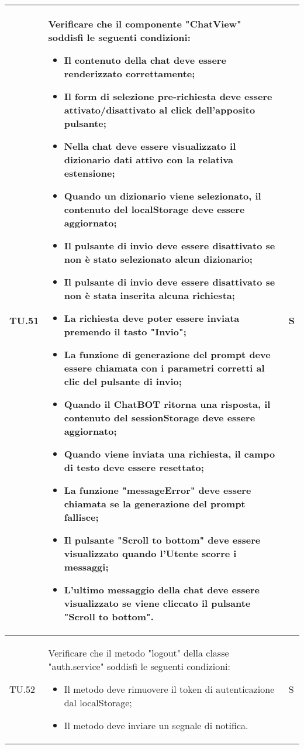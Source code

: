 \begin{adjustwidth}{-0.5cm}{-0.5cm}
\begin{longtable}{|P{1.5cm}|>{\raggedright}P{9.5cm}|>{\arraybackslash}P{1.5cm}|}
		\hline TU.51 & Verificare che il componente "ChatView" soddisfi le seguenti condizioni:
    \begin{itemize}
      \item Il contenuto della chat deve essere renderizzato correttamente;
			\item Il form di selezione pre-richiesta deve essere attivato/disattivato al click dell'apposito pulsante;
			\item Nella chat deve essere visualizzato il dizionario dati attivo con la relativa estensione;
			\item Quando un dizionario viene selezionato, il contenuto del localStorage deve essere aggiornato;
			\item Il pulsante di invio deve essere disattivato se non è stato selezionato alcun dizionario;
			\item Il pulsante di invio deve essere disattivato se non è stata inserita alcuna richiesta;
			\item La richiesta deve poter essere inviata premendo il tasto "Invio";
			\item La funzione di generazione del prompt deve essere chiamata con i parametri corretti al clic del pulsante di invio;
			\item Quando il ChatBOT ritorna una risposta, il contenuto del sessionStorage deve essere aggiornato;
			\item Quando viene inviata una richiesta, il campo di testo deve essere resettato;
			\item La funzione "messageError" deve essere chiamata se la generazione del prompt fallisce;
			\item Il pulsante "Scroll to bottom" deve essere visualizzato quando l'Utente scorre i messaggi;
			\item L'ultimo messaggio della chat deve essere visualizzato se viene cliccato il pulsante "Scroll to bottom".
    \end{itemize} & S \\

		\hline TU.52 & Verificare che il metodo "logout" della classe "auth.service" soddisfi le seguenti condizioni:
		\begin{itemize}
			\item Il metodo deve rimuovere il token di autenticazione dal localStorage;
			\item Il metodo deve inviare un segnale di notifica.
    \end{itemize} & S \\


\end{longtable}
\end{adjustwidth}
